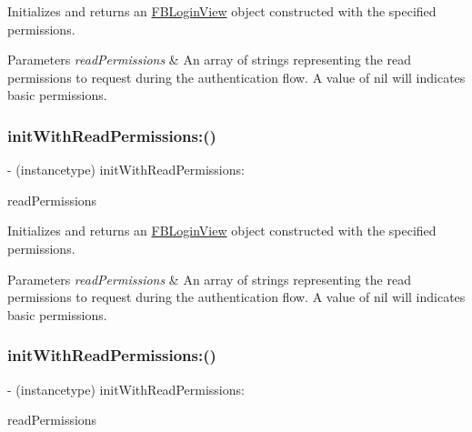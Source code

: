 Initializes and returns an {\ttfamily \hyperlink{interfaceFBLoginView}{F\+B\+Login\+View}} object constructed with the specified permissions.


\begin{DoxyParams}{Parameters}
{\em read\+Permissions} & An array of strings representing the read permissions to request during the authentication flow. A value of nil will indicates basic permissions. \\
\hline
\end{DoxyParams}
\mbox{\label{interfaceFBLoginView_a1a7bc3cf0ef2b11b1d3c7b6567ad937f}} 
\subsubsection{\texorpdfstring{init\+With\+Read\+Permissions\+:()}{initWithReadPermissions:()}\hspace{0.1cm}{\footnotesize\ttfamily [2/5]}}
{\footnotesize\ttfamily -\/ (instancetype) init\+With\+Read\+Permissions\+: \begin{DoxyParamCaption}\item[{(N\+S\+Array $\ast$)}]{read\+Permissions }\end{DoxyParamCaption}}

Initializes and returns an {\ttfamily \hyperlink{interfaceFBLoginView}{F\+B\+Login\+View}} object constructed with the specified permissions.


\begin{DoxyParams}{Parameters}
{\em read\+Permissions} & An array of strings representing the read permissions to request during the authentication flow. A value of nil will indicates basic permissions. \\
\hline
\end{DoxyParams}
\mbox{\label{interfaceFBLoginView_a1a7bc3cf0ef2b11b1d3c7b6567ad937f}} 
\subsubsection{\texorpdfstring{init\+With\+Read\+Permissions\+:()}{initWithReadPermissions:()}\hspace{0.1cm}{\footnotesize\ttfamily [3/5]}}
{\footnotesize\ttfamily -\/ (instancetype) init\+With\+Read\+Permissions\+: \begin{DoxyParamCaption}\item[{(N\+S\+Array $\ast$)}]{read\+Permissions }\end{DoxyParamCaption}}

